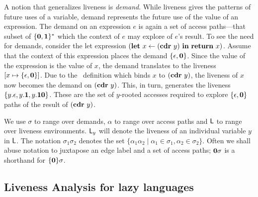\documentclass[preprint,9pt]{sigplanconf}
\begin{document}
A notion  that generalizes liveness  is {\em demand}.   While liveness
gives the patterns of future uses of a variable, demand represents the
future use of the value of an expression.  The demand on an expression
$e$   is   again   a   set    of   access   paths---that   subset   of
$\{\mathbf{0},\mathbf{1}\}^\ast$ which the  context of $e$ may  explore of $e$'s
result.   To see  the need  for demands,  consider the  let expression
$(\mbox{$\mathbf{ let}$}~x\leftarrow  (\mbox{$\mathbf{cdr}$}~y)~\mbox{$\mathbf{ in}$}~   \mbox{$\mathbf{ return}$}~x)$.   Assume   that  the
context of this expression places  the demand $\lbrace \epsilon, \mathbf{0}
\rbrace$. Since the  value of the expression is the  value of $x$, the
demand translates to the liveness  $[x \mapsto \lbrace \epsilon, \mathbf{0}
  \rbrace]$.   Due  to  the  \LET\   definition  which  binds  $x$  to
$(\mbox{$\mathbf{cdr}$}~y)$, the liveness of $x$  now becomes the demand on $(\mbox{$\mathbf{cdr}$}~y)$.
This, in  turn, generates  the liveness $\lbrace  y.\epsilon, y.\mathbf{1},
y.\mathbf{1}\mathbf{0}  \rbrace$.   These are  the  set  of $y$-rooted  accesses
required to  explore $\lbrace  \epsilon, \mathbf{0}  \rbrace$ paths  of the
result of $(\mbox{$\mathbf{cdr}$}~y)$.

We use $\sigma$  to range over demands, $\alpha$ to  range over access
paths  and $\mathsf{L}$  to range  over liveness  environments. $\mathsf{L}_y$  will
denote  the liveness  of an  individual  variable $y$  in $\mathsf{L}$.   The
notation $\sigma_1\sigma_2$ denotes  the set $\lbrace \alpha_1\alpha_2
\mid \alpha_1  \in \sigma_1, \alpha_2 \in  \sigma_2\rbrace$.  Often we
shall abuse  notation to juxtapose an  edge label and a  set of access
paths; $\mathbf{0}\sigma$ is a shorthand for $\lbrace\mathbf{0}\rbrace\sigma$.



\subsection{Liveness Analysis for lazy languages}
\label{sec:liveness-analysis}
  
\end{document}
